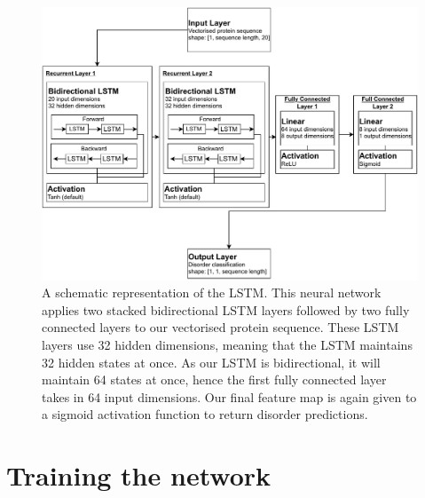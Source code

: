 \documentclass{l4proj}
\begin{document}
\begin{figure}[!ht]
    \centering
    \includegraphics[width=0.95\linewidth]{images/RNNdraw.pdf}    

    \caption{A schematic representation of the LSTM. This neural network applies two stacked bidirectional LSTM layers followed by two fully connected layers to our vectorised protein sequence. These LSTM layers use 32 hidden dimensions, meaning that the LSTM maintains 32 hidden states at once. As our LSTM is bidirectional, it will maintain 64 states at once, hence the first fully connected layer takes in 64 input dimensions. Our final feature map is again given to a sigmoid activation function to return disorder predictions.}

    \label{fig:RNN} 
\end{figure}

\section{Training the network}
\end{document}
